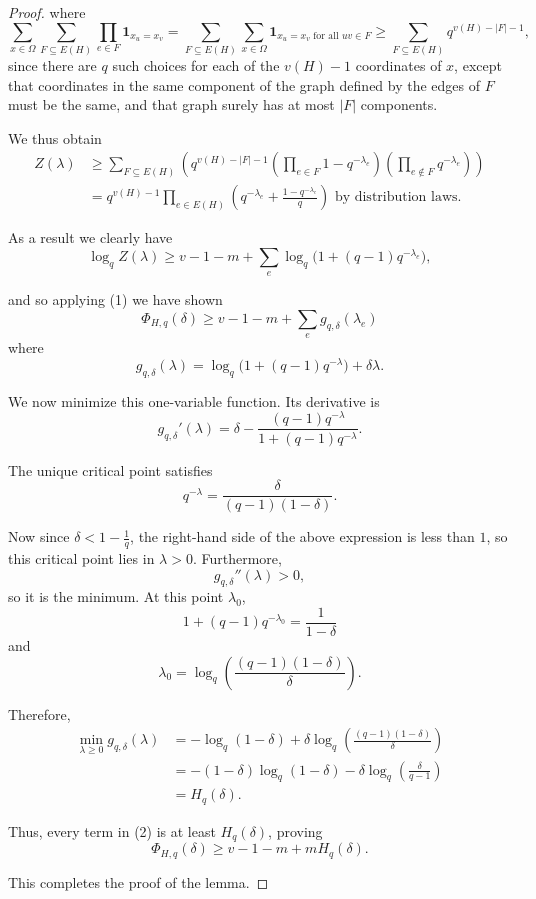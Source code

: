 \documentclass[10pt,a4paper]{amsart}
\begin{document}
\begin{proof}
where
\[
\sum_{x\in\Omega}\sum_{F\subseteq E(H)}\prod_{e\in F}\mathbf 1_{x_u=x_v}=\sum_{F\subseteq E(H)}\sum_{x\in\Omega}\mathbf 1_{x_u=x_v\text{ for all }uv\in F}\geq\sum_{F\subseteq E(H)}q^{v(H)-|F|-1},
\]
since there are $q$ such choices for each of the $v(H)-1$ coordinates of $x$, except that coordinates in the same component of the graph defined by the edges of $F$ must be the same, and that graph surely has at most $|F|$ components.

We thus obtain
\begin{align*}
    Z(\lambda)&\geq\sum_{F\subseteq E(H)}\left(q^{v(H)-|F|-1}(\prod_{e\in F}1-q^{-\lambda_e})(\prod_{e\not\in F} q^{-\lambda_e})\right)\\
    &=q^{v(H)-1}\prod_{e\in E(H)}(q^{-\lambda_e}+\frac{1-q^{-\lambda_e}}{q})\text{ by distribution laws}.
\end{align*}

As a result we clearly have
\[
\log_q Z(\lambda)\geq v-1-m+\sum_e \log_q\bigl(1+(q-1)q^{-\lambda_e}\bigr),
\]

and so applying (1) we have shown
\[
\Phi_{H,q}(\delta)\geq v-1-m+\sum_e g_{q,\delta}(\lambda_e)\tag{2}
\]
where
\[
g_{q,\delta}(\lambda)=\log_q\bigl(1+(q-1)q^{-\lambda}\bigr)+\delta\lambda.
\]




We now minimize this one-variable function. Its derivative is
\[
g_{q,\delta}'(\lambda)=\delta-\frac{(q-1)q^{-\lambda}}{1+(q-1)q^{-\lambda}}.
\]

The unique critical point satisfies
\[
q^{-\lambda}=\frac{\delta}{(q-1)(1-\delta)}.
\]

Now since $\delta<1-\frac1q$, the right-hand side of the above expression is less than $1$, so this critical point lies in
$\lambda>0$. Furthermore,
\[
g_{q,\delta}''(\lambda)>0,
\]
so it is the minimum. At this point $\lambda_0$,
\[
1+(q-1)q^{-\lambda_0}=\frac1{1-\delta}
\]
and
\[
\lambda_0=\log_q\left(\frac{(q-1)(1-\delta)}{\delta}\right).
\]

\noindent Therefore, 
\begin{align*}
\min_{\lambda\geq0}g_{q,\delta}(\lambda)
&=-\log_q(1-\delta)+\delta\log_q\left(\frac{(q-1)(1-\delta)}{\delta}\right)\\
&=-(1-\delta)\log_q(1-\delta)-\delta\log_q\left(\frac{\delta}{q-1}\right)\\
&=H_q(\delta).
\end{align*}

\noindent Thus, every term in (2) is at least $H_q(\delta)$, proving
\[
\Phi_{H,q}(\delta)\geq v-1-m+mH_q(\delta).
\]

\noindent This completes the proof of the lemma.
\end{proof}
\end{document}
